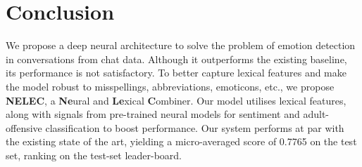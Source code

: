 \documentclass[11pt,a4paper]{article}
\begin{document}
\section{Conclusion}
We propose a deep neural architecture to solve the problem of emotion detection in conversations from chat data. Although it outperforms the existing baseline, its performance is not satisfactory. To better capture lexical features and make the model robust to misspellings, abbreviations, emoticons, etc., we propose \textbf{NELEC}, a \textbf{Ne}ural and \textbf{Le}xical \textbf{C}ombiner. Our model utilises lexical features, along with signals from pre-trained neural models for sentiment and adult-offensive classification to boost performance. Our system performs at par with the existing state of the art, yielding a micro-averaged  score of 0.7765 on the test set, ranking  on the test-set leader-board.



\end{document}
